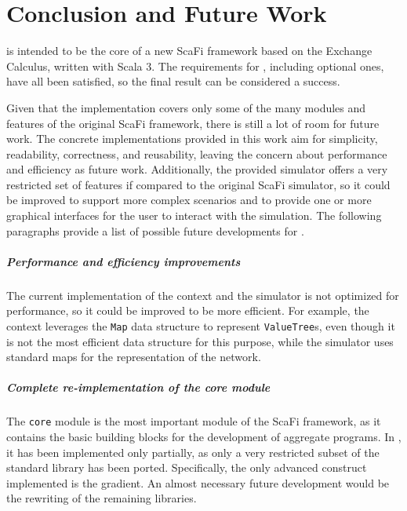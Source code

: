 \chapter{Conclusion and Future Work}
\label{chap:conclusion-and-future-work}

\this is intended to be the core of a new ScaFi framework based on the Exchange Calculus, written with Scala 3.
%
The requirements for \this, including optional ones, have all been satisfied, so the final result can be considered a success.

Given that the implementation covers only some of the many modules and features of the original ScaFi framework, there is still a lot of room for future work.
%
The concrete implementations provided in this work aim for simplicity, readability, correctness, and reusability, leaving the concern about performance and efficiency as future work.
%
Additionally, the provided simulator offers a very restricted set of features if compared to the original ScaFi simulator, so it could be improved to support more complex scenarios and to provide one or more graphical interfaces for the user to interact with the simulation.
%
The following paragraphs provide a list of possible future developments for \this.

\paragraph{Performance and efficiency improvements} The current implementation of the context and the simulator is not optimized for performance, so it could be improved to be more efficient.
%
For example, the context leverages the \texttt{Map} data structure to represent \texttt{ValueTree}s, even though it is not the most efficient data structure for this purpose, while the simulator uses standard maps for the representation of the network.

\paragraph{Complete re-implementation of the core module} The \texttt{core} module is the most important module of the ScaFi framework, as it contains the basic building blocks for the development of aggregate programs.
%
In \this, it has been implemented only partially, as only a very restricted subset of the standard library has been ported.
%
Specifically, the only advanced construct implemented is the gradient.
%
An almost necessary future development would be the rewriting of the remaining libraries.

